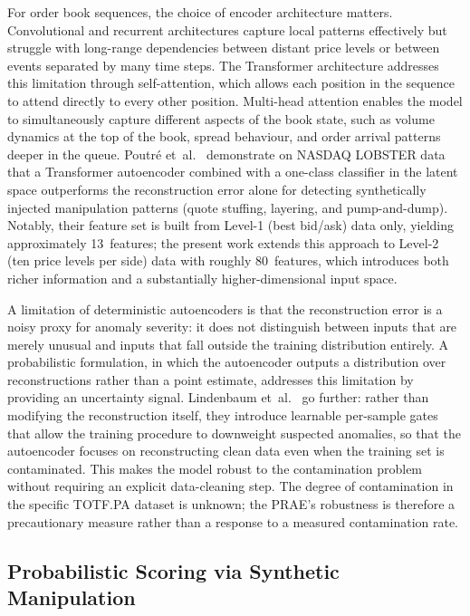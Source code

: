 \documentclass[11pt]{report}
\begin{document}
For order book sequences, the choice of encoder architecture matters. Convolutional and recurrent architectures capture local patterns effectively but struggle with long-range dependencies between distant price levels or between events separated by many time steps. The Transformer architecture addresses this limitation through self-attention, which allows each position in the sequence to attend directly to every other position. Multi-head attention enables the model to simultaneously capture different aspects of the book state, such as volume dynamics at the top of the book, spread behaviour, and order arrival patterns deeper in the queue. Poutr\'e et~al.~\cite{poutre_2024} demonstrate on NASDAQ LOBSTER data that a Transformer autoencoder combined with a one-class classifier in the latent space outperforms the reconstruction error alone for detecting synthetically injected manipulation patterns (quote stuffing, layering, and pump-and-dump). Notably, their feature set is built from Level-1 (best bid/ask) data only, yielding approximately 13~features; the present work extends this approach to Level-2 (ten price levels per side) data with roughly 80~features, which introduces both richer information and a substantially higher-dimensional input space.

A limitation of deterministic autoencoders is that the reconstruction error is a noisy proxy for anomaly severity: it does not distinguish between inputs that are merely unusual and inputs that fall outside the training distribution entirely. A probabilistic formulation, in which the autoencoder outputs a distribution over reconstructions rather than a point estimate, addresses this limitation by providing an uncertainty signal. Lindenbaum et~al.~\cite{lindenbaum2022prae} go further: rather than modifying the reconstruction itself, they introduce learnable per-sample gates that allow the training procedure to downweight suspected anomalies, so that the autoencoder focuses on reconstructing clean data even when the training set is contaminated. This makes the model robust to the contamination problem without requiring an explicit data-cleaning step. The degree of contamination in the specific TOTF.PA dataset is unknown; the PRAE's robustness is therefore a precautionary measure rather than a response to a measured contamination rate.

\subsection{Probabilistic Scoring via Synthetic Manipulation}\label{subsec:background:scoring}
\end{document}
